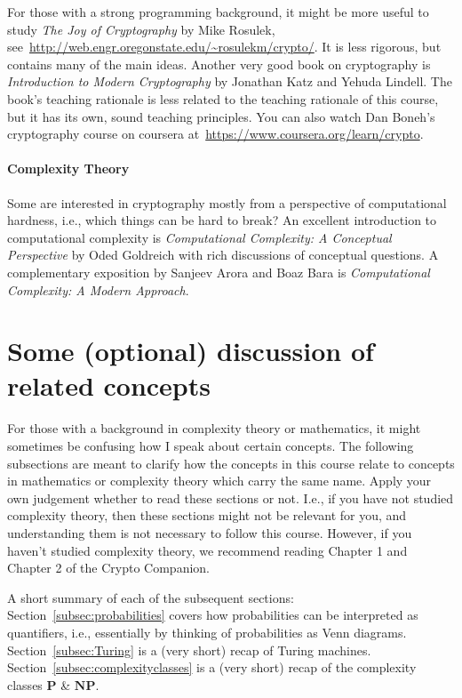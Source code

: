 \documentclass[a4paper,table,dvipsnames]{article}
\theoremstyle{definition}
\begin{document}
\medskip
For those with a strong programming background, it might be more useful to study \emph{The Joy of Cryptography} by Mike Rosulek, see~\url{http://web.engr.oregonstate.edu/~rosulekm/crypto/}. It is less rigorous, but contains many of the main ideas. Another very good book on cryptography is \emph{Introduction to Modern Cryptography} by Jonathan Katz and Yehuda Lindell. The book's teaching rationale is less related to the teaching rationale of this course, but it has its own, sound teaching principles. You can also watch Dan Boneh's cryptography course on coursera at~\url{https://www.coursera.org/learn/crypto}.

\paragraph{Complexity Theory} Some are interested in cryptography mostly from a perspective of computational hardness, i.e., which things can be hard to break? An excellent introduction to computational complexity is \emph{Computational Complexity: A Conceptual Perspective} by Oded Goldreich with rich discussions of conceptual questions. A complementary exposition by Sanjeev Arora and Boaz Bara is \emph{Computational Complexity: A Modern Approach}.

\clearpage
\section{Some (optional) discussion of related concepts}
For those with a background in complexity theory or mathematics, it might sometimes be confusing how I speak about certain concepts. The following subsections are meant to clarify how the concepts in this course relate to concepts in mathematics or complexity theory which carry the same name. Apply your own judgement whether to read these sections or not. I.e., if you have not studied complexity theory, then these sections might not be relevant for you, and understanding them is not necessary to follow this course. However, if you haven't studied complexity theory, we recommend reading Chapter 1 and Chapter 2 of the Crypto Companion.

\medskip
A short summary of each of the subsequent sections: Section~\ref{subsec:probabilities} covers how probabilities can be interpreted as quantifiers, i.e., essentially by thinking of probabilities as Venn diagrams. Section~\ref{subsec:Turing} is a (very short) recap of Turing machines. Section~\ref{subsec:complexityclasses} is a (very short) recap of the complexity classes $\textbf{P}$ \& $\textbf{NP}$.
\end{document}
